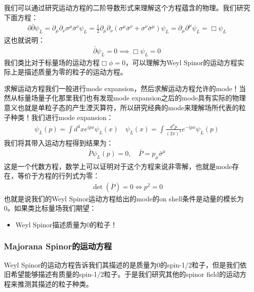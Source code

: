 \bigskip
{}

我们可以通过研究运动方程的二阶导数形式来理解这个方程蕴含的物理。我们研究下面方程：
\begin{align}
  \partial \bar{\partial} \psi_L = \partial_\mu \partial_\nu
  \sigma^\mu \bar{\sigma}^\nu \psi_L = \displaystyle\frac{1}{2}
  \partial_\mu \partial_\nu (\sigma^\mu \bar{\sigma}^\nu + \sigma^\nu
  \bar{\sigma}^\mu) \psi_L = \partial_\mu \partial^\mu \psi_L = \Box \psi_L
\end{align}
这也就说明：
\begin{align}
  \bar{\partial} \psi_L = 0 \implies \Box \psi_L = 0
\end{align}
我们类比对于标量场的运动方程$ \Box \phi = 0 $，可以理解为Weyl Spinor的运动方程实际上是描述质量为零的粒子的运动方程。

\bigskip
{}

求解运动方程我们一般进行mode expansion，然后求解运动方程允许的mode！当然从标量场量子化那里我们也有发现mode
expansion之后的mode具有实际的物理意义也就是单粒子态的产生湮灭算符，所以研究经典的mode来理解场所代表的粒子种类！我们进行mode
expansion：
\begin{align}
  \psi_L(p)=\int d^4xe^{ipx}\psi_L(x) \quad \psi_L(x)=\int
  \frac{d^4p}{(2\pi)^4}e^{-ipx}\psi_L(p)
\end{align}
我们将其带入运动方程得到结果为：
\begin{align}
  \bar{P}\psi_L(p)=0 , \quad \bar{P} = p_\mu \bar{\sigma}^\mu
\end{align}
这是一个代数方程，数学上可以证明对于这个方程来说非零解，也就是mode存在，等价于方程的行列式为零：
\begin{align}
  \det(\bar{P})=0\Leftrightarrow p^2=0
\end{align}
也就是说我们的Weyl Spinor运动方程给出的mode的on shell条件是动量的模长为0。如果类比标量场我们期望：
\begin{itemize}
  \item Weyl Spinor描述质量为0的粒子！
\end{itemize}

\subsubsection{Majorana Spinor的运动方程}
Weyl
Spinor的运动方程告诉我们其描述的是质量为0的spin-1/2粒子，但是我们依旧希望能够描述有质量的spin-1/2粒子。于是我们研究其他的spinor
field的运动方程来推测其描述的粒子种类。


